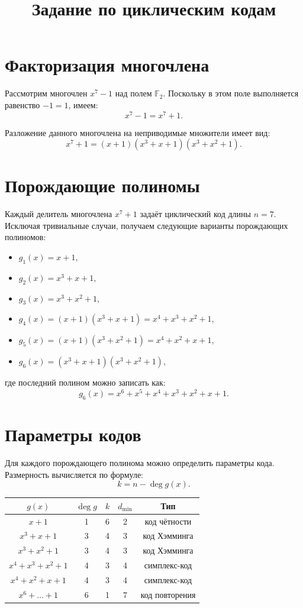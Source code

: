 \documentclass[a4paper,12pt]{article}
\title{Задание по циклическим кодам}
\author{}
\date{}
\begin{document}
\maketitle

\section{Факторизация многочлена}

Рассмотрим многочлен $x^7 - 1$ над полем $\mathbb{F}_2$.
Поскольку в этом поле выполняется равенство $-1 = 1$, имеем:
\[
x^7 - 1 = x^7 + 1.
\]

Разложение данного многочлена на неприводимые множители имеет вид:
\[
x^7 + 1 = (x + 1)(x^3 + x + 1)(x^3 + x^2 + 1).
\]

\section{Порождающие полиномы}

Каждый делитель многочлена $x^7 + 1$ задаёт циклический код длины $n=7$.
Исключая тривиальные случаи, получаем следующие варианты порождающих полиномов:

\begin{itemize}
    \item $g_1(x) = x + 1$,
    \item $g_2(x) = x^3 + x + 1$,
    \item $g_3(x) = x^3 + x^2 + 1$,
    \item $g_4(x) = (x + 1)(x^3 + x + 1) = x^4 + x^3 + x^2 + 1$,
    \item $g_5(x) = (x + 1)(x^3 + x^2 + 1) = x^4 + x^2 + x + 1$,
    \item $g_6(x) = (x^3 + x + 1)(x^3 + x^2 + 1)$,
\end{itemize}

где последний полином можно записать как:
\[
g_6(x) = x^6 + x^5 + x^4 + x^3 + x^2 + x + 1.
\]

\section{Параметры кодов}

Для каждого порождающего полинома можно определить параметры кода.
Размерность вычисляется по формуле:
\[
k = n - \deg g(x).
\]

\begin{center}
\begin{tabular}{c|c|c|c|c}
$g(x)$ & $\deg g$ & $k$ & $d_{\min}$ & Тип \\
\hline
$x+1$ & 1 & 6 & 2 & код чётности \\
$x^3+x+1$ & 3 & 4 & 3 & код Хэмминга \\
$x^3+x^2+1$ & 3 & 4 & 3 & код Хэмминга \\
$x^4+x^3+x^2+1$ & 4 & 3 & 4 & симплекс-код \\
$x^4+x^2+x+1$ & 4 & 3 & 4 & симплекс-код \\
$x^6+\dots+1$ & 6 & 1 & 7 & код повторения \\
\end{tabular}
\end{center}
\end{document}
